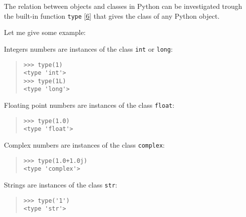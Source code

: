 \documentclass[10pt,english]{article}
\begin{document}
The relation between objects and classes in Python can be investigated
trough the built-in function \texttt{type} [\hyperlink{id12}{6}] that gives the class of any 
Python object.

Let me give some example:
\begin{list}{.}
{
\setlength{\rightmargin}{\leftmargin}
}
\item {} 
Integers numbers are instances of the class \texttt{int} or \texttt{long}:

\end{list}
\begin{quote}
\begin{verbatim}>>> type(1)
<type 'int'>
>>> type(1L)
<type 'long'>\end{verbatim}
\end{quote}
\begin{list}{.}
{
\addtocounter{listcnt6}{1}
\setlength{\rightmargin}{\leftmargin}
}
\item {} 
Floating point numbers are instances of the class \texttt{float}:

\end{list}
\begin{quote}
\begin{verbatim}>>> type(1.0)
<type 'float'>\end{verbatim}
\end{quote}
\begin{list}{.}
{
\addtocounter{listcnt7}{2}
\setlength{\rightmargin}{\leftmargin}
}
\item {} 
Complex numbers are instances of the class \texttt{complex}:

\end{list}
\begin{quote}
\begin{verbatim}>>> type(1.0+1.0j)
<type 'complex'>\end{verbatim}
\end{quote}
\begin{list}{.}
{
\addtocounter{listcnt8}{3}
\setlength{\rightmargin}{\leftmargin}
}
\item {} 
Strings are instances of the class \texttt{str}:

\end{list}
\begin{quote}
\begin{verbatim}>>> type('1')
<type 'str'>\end{verbatim}
\end{quote}
\end{document}
